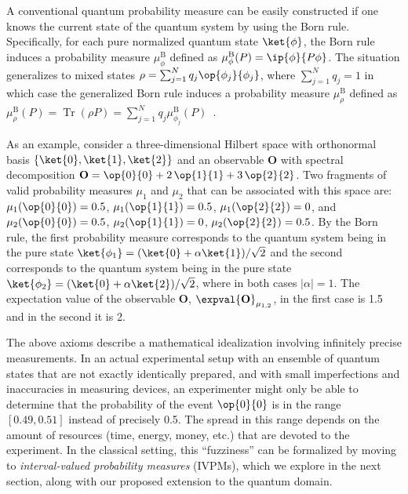 \documentclass[english,reprint, aps, prl,superscriptaddress, showpacs,
showkeys, longbibliography, amsmath, amssymb]{revtex4-1}
\theoremstyle{plain}
\theoremstyle{definition}
\newcommand{\proj}[1]{\op{#1}{#1}}
\newcommand{\Tr}{\ensuremath{\mathop{\mathrm{Tr}}\nolimits}}
\begin{document}
A conventional quantum probability measure can be easily
constructed if one knows the current state of the quantum system by
using the Born rule.  Specifically, for each pure normalized quantum
state $\ket{\phi}$, the Born rule induces a probability measure
$\mu_{\phi}^{\mathrm{B}}$ defined as
$\mu_{\phi}^{\mathrm{B}}(P)=\ip{\phi}{P\phi}$. The situation
generalizes to mixed states
$\rho = \sum_{j=1}^{N}q_{j}\proj{\phi_{j}}$, where
$\sum_{j=1}^{N}q_{j}=1$ in which case the generalized Born rule
induces a probability measure $\mu_{\rho}^{\mathrm{B}}$ defined as
$\mu_{\rho}^{\mathrm{B}}\left(P\right) = \Tr\left(\rho P\right) =
\sum_{j=1}^{N}
q_{j}\mu_{\phi_{j}}^{\mathrm{B}}\left(P\right)$~\cite{peres1995quantum,544199,Jaeger2007}.


As an example, consider a three-dimensional Hilbert space with
orthonormal basis $\{\ket{0},\ket{1},\ket{2}\}$ and an observable
$\mathbf{O}$ with spectral decomposition
$\mathbf{O} = \proj{0} + 2\,\proj{1} + 3\,\proj{2}$. Two fragments of
valid probability measures $\mu_1$ and $\mu_2$ that can be associated
with this space are: $\mu_1(\proj{0}) = 0.5$, $\mu_1(\proj{1}) = 0.5$,
$\mu_1(\proj{2}) = 0$, and $\mu_2(\proj{0}) = 0.5$,
$\mu_2(\proj{1}) = 0$, $\mu_2(\proj{2}) = 0.5$. By the Born rule, the
first probability measure corresponds to the quantum system being in
the pure state $\ket{\phi_1}=(\ket{0}+\alpha\ket{1})/\sqrt{2}$ and the second
corresponds to the quantum system being in the pure state
$\ket{\phi_2}=(\ket{0}+\alpha\ket{2})/\sqrt{2}$, where in both cases
$|\alpha|=1$. The expectation value of the observable $\mathbf{O}$, 
$\expval{\mathbf{O}}_{\mu_{1,2}}$, in
the first case is 1.5 and in the second it is 2.

The above axioms describe a mathematical idealization involving
infinitely precise measurements. In an actual experimental setup with
an ensemble of quantum states that are not exactly identically
prepared, and with small imperfections and inaccuracies in measuring
devices, an experimenter might only be able to determine that the
probability of the event $\proj{0}$ is in the range $[0.49,0.51]$
instead of precisely 0.5. The spread in this range depends on the
amount of resources (time, energy, money, etc.) that are devoted to
the experiment. In the classical setting, this ``fuzziness'' can be
formalized by moving to \emph{interval-valued probability measures}
(IVPMs), which we explore in the next section, along with our proposed
extension to the quantum domain.

\end{document}
